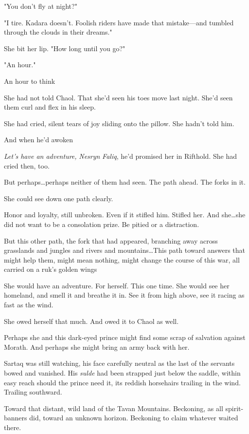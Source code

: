 "You don't fly at night?"

"I tire.
Kadara doesn't.
Foolish riders have made that mistake---and tumbled through the clouds in their dreams."

She bit her lip.
"How long until you go?"

"An hour."

An hour to think 

She had not told Chaol.
That she'd seen his toes move last night.
She'd seen them curl and flex in his sleep.

She had cried, silent tears of joy sliding onto the pillow.
She hadn't told him.

And when he'd awoken 

\emph{Let's have an adventure,} \emph{Nesryn} \emph{Faliq}, he'd promised her in Rifthold.
She had cried then, too.

But perhaps\ldots perhaps neither of them had seen.
The path ahead.
The forks in it.

She could see down one path clearly.

Honor and loyalty, still unbroken.
Even if it stifled him.
Stifled her.
And she\ldots she did not want to be a consolation prize.
Be pitied or a distraction.

But this other path, the fork that had appeared, branching away across grasslands and jungles and rivers and mountains\ldots This path toward answers that might help them, might mean nothing, might change the course of this war, all carried on a ruk's golden wings 

She would have an adventure.
For herself.
This one time.
She would see her homeland, and smell it and breathe it in.
See it from high above, see it racing as fast as the wind.

She owed herself that much.
And owed it to Chaol as well.

Perhaps she and this dark-eyed prince might find some scrap of salvation against Morath.
And perhaps she might bring an army back with her.

Sartaq was still watching, his face carefully neutral as the last of the servants bowed and vanished.
His \emph{sulde} had been strapped just below the saddle, within easy reach should the prince need it, its reddish horsehairs trailing in the wind.
Trailing southward.

Toward that distant, wild land of the Tavan Mountains.
Beckoning, as all spirit-banners did, toward an unknown horizon.
Beckoning to claim whatever waited there.

